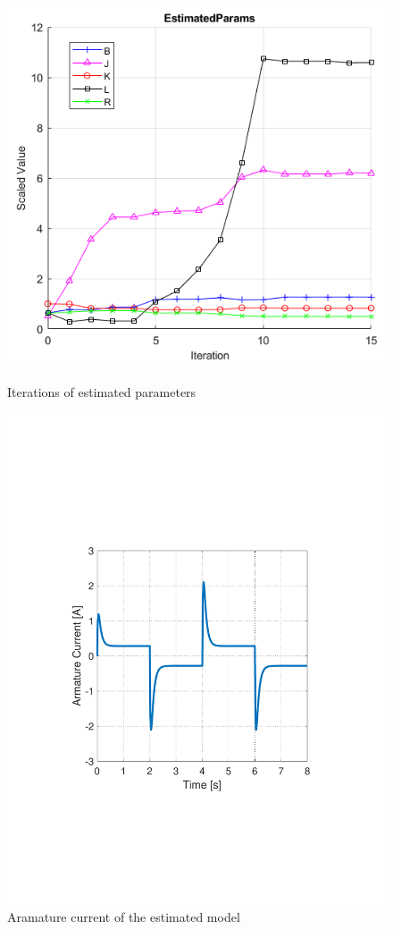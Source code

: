 \documentclass[12pt,english,twoside]{article}
\begin{document}
 \begin{figure}[htb!]
 	\centering
 	\includegraphics[width=\textwidth]{figures/simulink_par_est_2.png}
 	\caption{Iterations of estimated parameters}
 	\endminipage\hfill
 	\centering
 	\includegraphics[width=\textwidth]{figures/simulink_armature_current}
 	\caption{Aramature current of the estimated model}
 	\label{simulink_armature_current}
 	\endminipage\hfill
 \end{figure}
\end{document}
